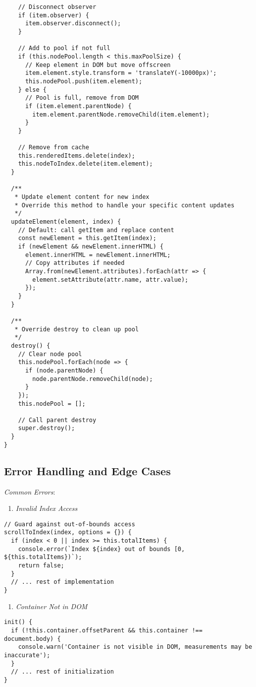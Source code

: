\documentclass[11pt]{article}
\begin{document}
\begin{verbatim}
    // Disconnect observer
    if (item.observer) {
      item.observer.disconnect();
    }
    
    // Add to pool if not full
    if (this.nodePool.length < this.maxPoolSize) {
      // Keep element in DOM but move offscreen
      item.element.style.transform = 'translateY(-10000px)';
      this.nodePool.push(item.element);
    } else {
      // Pool is full, remove from DOM
      if (item.element.parentNode) {
        item.element.parentNode.removeChild(item.element);
      }
    }
    
    // Remove from cache
    this.renderedItems.delete(index);
    this.nodeToIndex.delete(item.element);
  }
  
  /**
   * Update element content for new index
   * Override this method to handle your specific content updates
   */
  updateElement(element, index) {
    // Default: call getItem and replace content
    const newElement = this.getItem(index);
    if (newElement && newElement.innerHTML) {
      element.innerHTML = newElement.innerHTML;
      // Copy attributes if needed
      Array.from(newElement.attributes).forEach(attr => {
        element.setAttribute(attr.name, attr.value);
      });
    }
  }
  
  /**
   * Override destroy to clean up pool
   */
  destroy() {
    // Clear node pool
    this.nodePool.forEach(node => {
      if (node.parentNode) {
        node.parentNode.removeChild(node);
      }
    });
    this.nodePool = [];
    
    // Call parent destroy
    super.destroy();
  }
}
\end{verbatim}
\subsection{Error Handling and Edge Cases}
\label{sec:orge79a560}

\emph{Common Errors}:

\begin{enumerate}
\item \emph{Invalid Index Access}
\end{enumerate}
\begin{verbatim}
// Guard against out-of-bounds access
scrollToIndex(index, options = {}) {
  if (index < 0 || index >= this.totalItems) {
    console.error(`Index ${index} out of bounds [0, ${this.totalItems})`);
    return false;
  }
  // ... rest of implementation
}
\end{verbatim}

\begin{enumerate}
\item \emph{Container Not in DOM}
\end{enumerate}
\begin{verbatim}
init() {
  if (!this.container.offsetParent && this.container !== document.body) {
    console.warn('Container is not visible in DOM, measurements may be inaccurate');
  }
  // ... rest of initialization
}
\end{verbatim}
\end{document}

